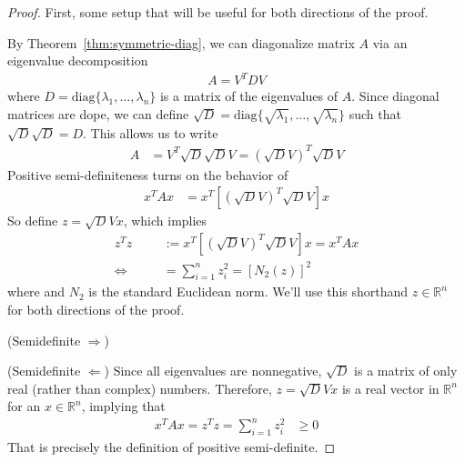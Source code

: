 \documentclass[12pt]{article}
\numberwithin{equation}{section} %
\theoremstyle{plain}
\theoremstyle{definition}
\theoremstyle{remark}
\newcommand{\diag}{\text{diag}}
\newcommand{\R}{\mathbb{R}}
\newcommand{\Rn}{\mathbb{R}^n}
\begin{document}
\begin{proof}
First, some setup that will be useful for both directions of the proof.

By Theorem~\ref{thm:symmetric-diag}, we can diagonalize matrix $A$ via
an eigenvalue decomposition
\begin{align*}
  A = V^T D V
\end{align*}
where $D=\diag\{\lambda_1,\ldots,\lambda_n\}$ is a matrix of the
eigenvalues of $A$.  Since diagonal matrices are dope, we can define
$\sqrt{D}=\diag\{\sqrt{\lambda_1},\ldots,\sqrt{\lambda_n}\}$ such that
$\sqrt{D}\sqrt{D}=D$. This allows us to write
\begin{align*}
  A &= V^T \sqrt{D} \sqrt{D} V
  = \left(\sqrt{D} V\right)^T \sqrt{D} V
\end{align*}
Positive semi-definiteness turns on the behavior of
\begin{align*}
  x^T A x &=
  x^T  \left[\left(\sqrt{D} V\right)^T \sqrt{D} V\right] x
\end{align*}
So define $z = \sqrt{D}Vx$, which implies
\begin{align*}
  z^T z &:=x^T  \left[\left(\sqrt{D} V\right)^T \sqrt{D} V\right] x
  = x^T A x\\
  \Leftrightarrow \qquad
  &=  \sum^n_{i=1} z_i^2 = \left[N_2(z)\right]^2
\end{align*}
where and $N_2$ is the standard Euclidean norm. We'll
use this shorthand $z\in\Rn$ for both directions of the proof.

(Semidefinite $\Rightarrow$)




(Semidefinite $\Leftarrow$)
Since all eigenvalues are nonnegative, $\sqrt{D}$ is a matrix of only
real (rather than complex) numbers. Therefore, $z = \sqrt{D} Vx$ is a
real vector in $\Rn$ for an $x\in\Rn$, implying that
\begin{align*}
  x^T A x = z^T z =
  \sum^n_{i=1} z_i^2 &\geq 0
\end{align*}
That is precisely the definition of positive semi-definite.


\end{proof}
\end{document}
